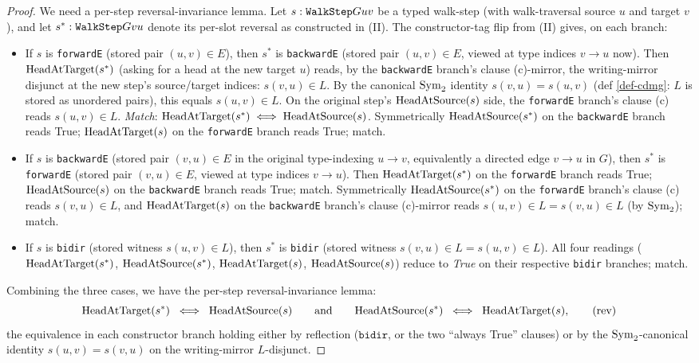 \documentclass[main]{subfiles}
\begin{document}
\begin{proof}
We need a per-step reversal-invariance lemma. Let $s : \texttt{WalkStep} G u v$ be a typed walk-step (with walk-traversal source $u$ and target $v$), and let $s^* : \texttt{WalkStep} G v u$ denote its per-slot reversal as constructed in (II). The constructor-tag flip from (II) gives, on each branch:
\begin{itemize}
    \item If $s$ is \texttt{forwardE} (stored pair $(u, v) \in E$), then $s^*$ is \texttt{backwardE} (stored pair $(u, v) \in E$, viewed at type indices $v \to u$ now). Then $\mathrm{HeadAtTarget}(s^*)$ (asking for a head at the new target $u$) reads, by the \texttt{backwardE} branch's clause (c)-mirror, the writing-mirror disjunct at the new step's source/target indices: $s(v, u) \in L$. By the canonical $\mathrm{Sym}_2$ identity $s(v, u) = s(u, v)$ (def \ref{def-cdmg}: $L$ is stored as unordered pairs), this equals $s(u, v) \in L$. On the original step's $\mathrm{HeadAtSource}(s)$ side, the \texttt{forwardE} branch's clause (c) reads $s(u, v) \in L$. \emph{Match}: $\mathrm{HeadAtTarget}(s^*) \iff \mathrm{HeadAtSource}(s)$. Symmetrically $\mathrm{HeadAtSource}(s^*)$ on the \texttt{backwardE} branch reads True; $\mathrm{HeadAtTarget}(s)$ on the \texttt{forwardE} branch reads True; match.
    \item If $s$ is \texttt{backwardE} (stored pair $(v, u) \in E$ in the original type-indexing $u \to v$, equivalently a directed edge $v \to u$ in $G$), then $s^*$ is \texttt{forwardE} (stored pair $(v, u) \in E$, viewed at type indices $v \to u$). Then $\mathrm{HeadAtTarget}(s^*)$ on the \texttt{forwardE} branch reads True; $\mathrm{HeadAtSource}(s)$ on the \texttt{backwardE} branch reads True; match. Symmetrically $\mathrm{HeadAtSource}(s^*)$ on the \texttt{forwardE} branch's clause (c) reads $s(v, u) \in L$, and $\mathrm{HeadAtTarget}(s)$ on the \texttt{backwardE} branch's clause (c)-mirror reads $s(u, v) \in L = s(v, u) \in L$ (by $\mathrm{Sym}_2$); match.
    \item If $s$ is \texttt{bidir} (stored witness $s(u, v) \in L$), then $s^*$ is \texttt{bidir} (stored witness $s(v, u) \in L = s(u, v) \in L$). All four readings ($\mathrm{HeadAtTarget}(s^*)$, $\mathrm{HeadAtSource}(s^*)$, $\mathrm{HeadAtTarget}(s)$, $\mathrm{HeadAtSource}(s)$) reduce to \emph{True} on their respective \texttt{bidir} branches; match.
\end{itemize}
Combining the three cases, we have the per-step reversal-invariance lemma:
\begin{equation}
    \mathrm{HeadAtTarget}(s^*) \;\iff\; \mathrm{HeadAtSource}(s)
    \qquad\text{and}\qquad
    \mathrm{HeadAtSource}(s^*) \;\iff\; \mathrm{HeadAtTarget}(s),
    \tag{rev}
\end{equation}
the equivalence in each constructor branch holding either by reflection ($\texttt{bidir}$, or the two ``always True'' clauses) or by the $\mathrm{Sym}_2$-canonical identity $s(u, v) = s(v, u)$ on the writing-mirror $L$-disjunct.


\end{proof}
\end{document}
